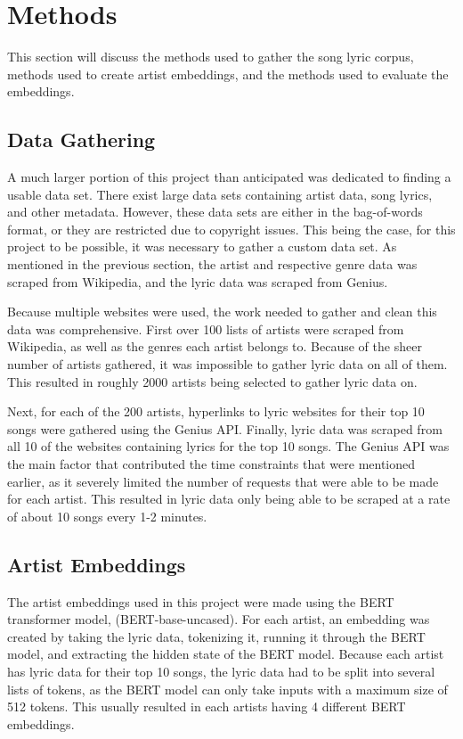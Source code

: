 \documentclass[11pt,a4paper]{article}
\begin{document}
\section{Methods}
 This section will discuss the methods used to gather the song lyric corpus, methods used to create artist embeddings, and the methods used to evaluate the embeddings.
\subsection{Data Gathering}
A much larger portion of this project than anticipated was dedicated to finding a usable data set. There exist large data sets containing artist data, song lyrics, and other metadata. However, these data sets are either in the bag-of-words format, or they are restricted due to copyright issues. This being the case, for this project to be possible, it was necessary to gather a custom data set. As mentioned in the previous section, the artist and respective genre data was scraped from Wikipedia, and the lyric data was scraped from Genius.

Because multiple websites were used, the work needed to gather and clean this data was comprehensive. First over 100 lists of artists were scraped from Wikipedia, as well as the genres each artist belongs to. Because of the sheer number of artists gathered, it was impossible to gather lyric data on all of them. This resulted in roughly 2000 artists being selected to gather lyric data on.

Next, for each of the 200 artists, hyperlinks to lyric websites for their top 10 songs were gathered using the Genius API. Finally, lyric data was scraped from all 10 of the websites containing lyrics for the top 10 songs. The Genius API was the main factor that contributed the time constraints that were mentioned earlier, as it severely limited the number of requests that were able to be made for each artist. This resulted in lyric data only being able to be scraped at a rate of about 10 songs every 1-2 minutes.

\subsection{Artist Embeddings}
The artist embeddings used in this project were made using the BERT transformer model, (BERT-base-uncased). For each artist, an embedding was created by taking the lyric data, tokenizing it, running it through the BERT model, and extracting the hidden state of the BERT model. Because each artist has lyric data for their top 10 songs, the lyric data had to be split into several lists of tokens, as the BERT model can only take inputs with a maximum size of 512 tokens. This usually resulted in each artists having 4 different BERT embeddings.
\end{document}
